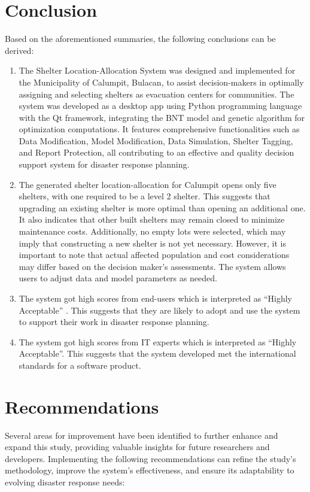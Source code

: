 \section{Conclusion}
	Based on the aforementioned summaries, the following conclusions can be derived:

	\begin{enumerate}
		\item The Shelter Location-Allocation System was designed and implemented for the Municipality of Calumpit, Bulacan, to assist decision-makers in optimally assigning and selecting shelters as evacuation centers for communities. The system was developed as a desktop app using Python programming language with the Qt framework, integrating the BNT model and genetic algorithm for optimization computations. It features comprehensive functionalities such as Data Modification, Model Modification, Data Simulation, Shelter Tagging, and Report Protection, all contributing to an effective and quality decision support system for disaster response planning.
		\item The generated shelter location-allocation for Calumpit opens only five shelters, with one required to be a level 2 shelter. This suggests that upgrading an existing shelter is more optimal than opening an additional one. It also indicates that other built shelters may remain closed to minimize maintenance costs. Additionally, no empty lots were selected, which may imply that constructing a new shelter is not yet necessary. However, it is important to note that actual affected population and cost considerations may differ based on the decision maker's assessments. The system allows users to adjust data and model parameters as needed.
		\item The system got high scores from end-users which is interpreted as “Highly Acceptable” . This suggests that they are likely to adopt and use the system to support their work in disaster response planning.
		\item The system got high scores from IT experts which is interpreted as “Highly Acceptable”. This suggests that the system developed met the international standards for a software product.
	\end{enumerate}

\section{Recommendations}
	Several areas for improvement have been identified to further enhance and expand this study, providing valuable insights for future researchers and developers. Implementing the following recommendations can refine the study’s methodology, improve the system’s effectiveness, and ensure its adaptability to evolving disaster response needs:
	

